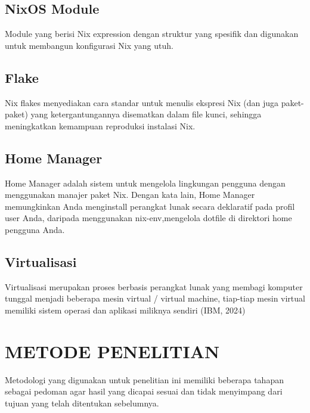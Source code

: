 \documentclass[10pt,twoside]{report}
\begin{document}
\section{NixOS Module}
\begin{adjustwidth}{20pt}{}

	Module yang berisi Nix expression dengan struktur yang spesifik dan digunakan
	untuk membangun konfigurasi Nix yang utuh.
\end{adjustwidth}
\section{Flake}
\begin{adjustwidth}{20pt}{}
	Nix flakes menyediakan cara standar untuk menulis ekspresi Nix (dan juga paket-paket) yang ketergantungannya disematkan dalam file kunci, sehingga meningkatkan kemampuan reproduksi instalasi Nix.
\end{adjustwidth}
\section{Home Manager}
\begin{adjustwidth}{20pt}{}

	Home Manager adalah sistem untuk mengelola lingkungan pengguna dengan
	menggunakan manajer paket Nix. Dengan kata lain, Home Manager memungkinkan
	Anda menginstall perangkat lunak secara deklaratif pada profil user Anda,
	daripada menggunakan nix-env,mengelola dotfile di direktori home pengguna
	Anda.
\end{adjustwidth}
\section{Virtualisasi}
\begin{adjustwidth}{20pt}{}

	Virtualisasi merupakan proses berbasis perangkat lunak yang membagi komputer
	tunggal menjadi beberapa mesin virtual / virtual machine, tiap-tiap mesin
	virtual memiliki sistem operasi dan aplikasi miliknya sendiri (IBM, 2024)
\end{adjustwidth}
\chapter{METODE PENELITIAN}
Metodologi yang digunakan untuk penelitian ini memiliki beberapa tahapan
sebagai pedoman agar hasil yang dicapai sesuai dan tidak menyimpang dari tujuan
yang telah ditentukan sebelumnya.
\end{document}
